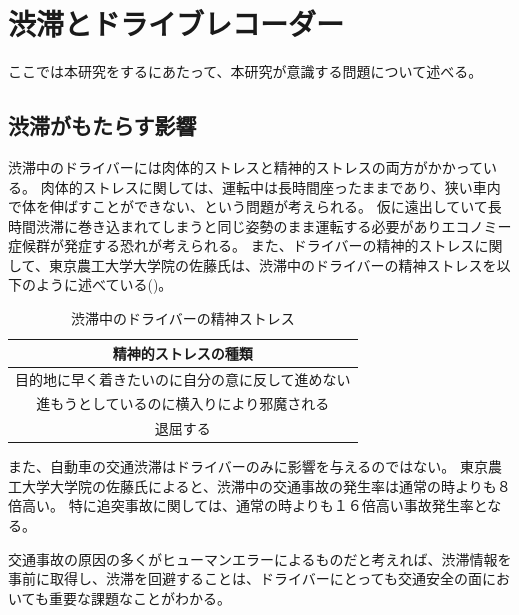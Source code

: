 \chapter{渋滞とドライブレコーダー}
ここでは本研究をするにあたって、本研究が意識する問題について述べる。


\section{渋滞がもたらす影響}
渋滞中のドライバーには肉体的ストレスと精神的ストレスの両方がかかっている。
肉体的ストレスに関しては、運転中は長時間座ったままであり、狭い車内で体を伸ばすことができない、という問題が考えられる。
仮に遠出していて長時間渋滞に巻き込まれてしまうと同じ姿勢のまま運転する必要がありエコノミー症候群が発症する恐れが考えられる。
また、ドライバーの精神的ストレスに関して、東京農工大学大学院の佐藤氏\cite{alma99344256104031}は、渋滞中のドライバーの精神ストレスを以下のように述べている()。


\begin{table}[htbp]
  \centering
  \begin{scriptsize}
\begin{tabular}{c}
  \toprule
  精神的ストレスの種類 \\
  \midrule
  目的地に早く着きたいのに自分の意に反して進めない \\
  進もうとしているのに横入りにより邪魔される \\
  退屈する \\
  \bottomrule
\end{tabular}
\end{scriptsize}
\caption{渋滞中のドライバーの精神ストレス}
\label{tab:stress_of_driver}
\end{table}



また、自動車の交通渋滞はドライバーのみに影響を与えるのではない。
東京農工大学大学院の佐藤氏によると、渋滞中の交通事故の発生率は通常の時よりも８倍高い\cite{alma99344256104031}。
特に追突事故に関しては、通常の時よりも１６倍高い事故発生率となる。

交通事故の原因の多くがヒューマンエラーによるものだと考えれば、渋滞情報を事前に取得し、渋滞を回避することは、ドライバーにとっても交通安全の面においても重要な課題なことがわかる。

